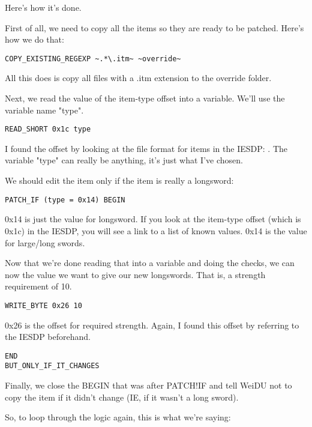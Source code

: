 \documentclass{article}
\def\ttref#1{\ahrefloc{#1}{\tt #1}}
\begin{document}
Here's how it's done.

First of all, we need to copy all the items so they are ready to be patched.
Here's how we do that:

\begin{verbatim}
COPY_EXISTING_REGEXP ~.*\.itm~ ~override~
\end{verbatim}

All this does is copy all files with a .itm extension to the override folder.

Next, we read the value of the item-type offset into a variable. We'll use the variable
name "type".

\begin{verbatim}
READ_SHORT 0x1c type
\end{verbatim}

I found the offset by looking at the file format for items in the IESDP:
. The
variable "type" can really be anything, it's just what I've chosen.

We should edit the item only if the item is really a longsword:

\begin{verbatim}
PATCH_IF (type = 0x14) BEGIN
\end{verbatim}

0x14 is just the value for longsword. If you look at the item-type offset (which
is 0x1c) in the IESDP, you will see a link to a list of known values. 0x14 is the
value for large/long swords.

Now that we're done reading that into a variable and doing the checks, we can now
\ttref{WRITE!BYTE} the value we want to give our new longswords. That is, a strength
requirement of 10.

\begin{verbatim}
WRITE_BYTE 0x26 10
\end{verbatim}

0x26 is the offset for required strength.  Again, I found this offset by referring to the IESDP beforehand.

\begin{verbatim}
END
BUT_ONLY_IF_IT_CHANGES
\end{verbatim}

Finally, we close the BEGIN that was after PATCH!IF and tell WeiDU not to copy
the item if it didn't change (IE, if it wasn't a long sword).

So, to loop through the logic again, this is what we're saying:
\end{document}
